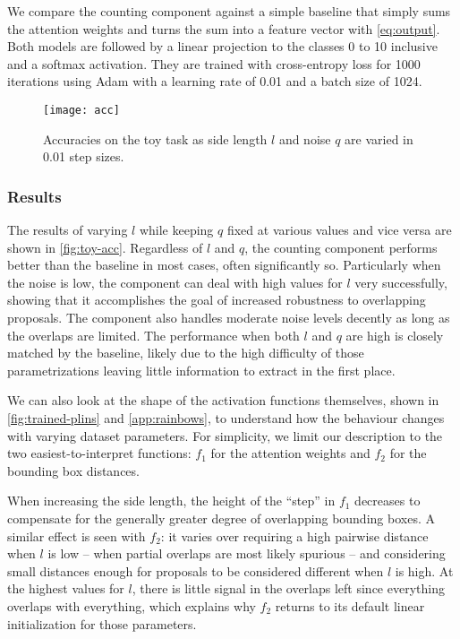 \documentclass[letterpaper]{article}
\begin{document}
We compare the counting component against a simple baseline that simply sums the attention weights and turns the sum into a feature vector with \autoref{eq:output}.
Both models are followed by a linear projection to the classes 0 to 10 inclusive and a softmax activation.
They are trained with cross-entropy loss for 1000 iterations using Adam \citep{Kingma2014a} with a learning rate of 0.01 and a batch size of 1024.


\begin{figure}
    \centering
    \texttt{[image: acc]}
    \caption{Accuracies on the toy task as side length $l$ and noise $q$ are varied in 0.01 step sizes.}
    \label{fig:toy-acc}
\end{figure}

\subsubsection{Results}
The results of varying $l$ while keeping $q$ fixed at various values and vice versa are shown in \autoref{fig:toy-acc}.
Regardless of $l$ and $q$, the counting component performs better than the baseline in most cases, often significantly so.
Particularly when the noise is low, the component can deal with high values for $l$ very successfully, showing that it accomplishes the goal of increased robustness to overlapping proposals.
The component also handles moderate noise levels decently as long as the overlaps are limited.
The performance when both $l$ and $q$ are high is closely matched by the baseline, likely due to the high difficulty of those parametrizations leaving little information to extract in the first place.

We can also look at the shape of the activation functions themselves, shown in \autoref{fig:trained-plins} and \autoref{app:rainbows}, to understand how the behaviour changes with varying dataset parameters.
For simplicity, we limit our description to the two easiest-to-interpret functions: $f_1$ for the attention weights and $f_2$ for the bounding box distances.

When increasing the side length, the height of the ``step'' in $f_1$ decreases to compensate for the generally greater degree of overlapping bounding boxes.
A similar effect is seen with $f_2$: it varies over requiring a high pairwise distance when $l$ is low -- when partial overlaps are most likely spurious -- and considering small distances enough for proposals to be considered different when $l$ is high.
At the highest values for $l$, there is little signal in the overlaps left since everything overlaps with everything, which explains why $f_2$ returns to its default linear initialization for those parameters.
\end{document}

